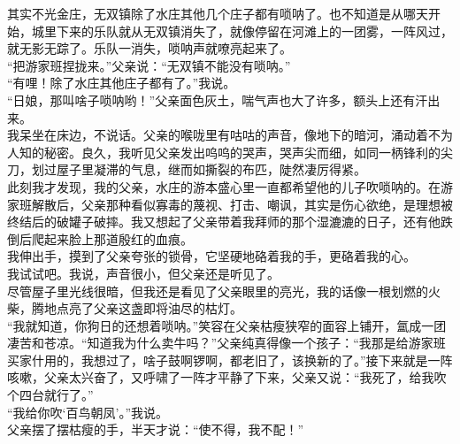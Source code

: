 其实不光金庄，无双镇除了水庄其他几个庄子都有唢呐了。也不知道是从哪天开始，城里下来的乐队就从无双镇消失了，就像停留在河滩上的一团雾，一阵风过，就无影无踪了。乐队一消失，唢呐声就嘹亮起来了。\\

“把游家班捏拢来。”父亲说：“无双镇不能没有唢呐。”\\

“有哩！除了水庄其他庄子都有了。”我说。\\

“日娘，那叫啥子唢呐哟！”父亲面色灰土，喘气声也大了许多，额头上还有汗出来。\\

我呆坐在床边，不说话。父亲的喉咙里有咕咕的声音，像地下的暗河，涌动着不为人知的秘密。良久，我听见父亲发出呜呜的哭声，哭声尖而细，如同一柄锋利的尖刀，划过屋子里凝滞的气息，继而如撕裂的布匹，陡然凄厉得紧。\\

此刻我才发现，我的父亲，水庄的游本盛心里一直都希望他的儿子吹唢呐的。在游家班解散后，父亲那种看似寡毒的蔑视、打击、嘲讽，其实是伤心欲绝，是理想被终结后的破罐子破摔。我又想起了父亲带着我拜师的那个湿漉漉的日子，还有他跌倒后爬起来脸上那道殷红的血痕。\\

我伸出手，摸到了父亲夸张的锁骨，它坚硬地硌着我的手，更硌着我的心。\\

我试试吧。我说，声音很小，但父亲还是听见了。\\

尽管屋子里光线很暗，但我还是看见了父亲眼里的亮光，我的话像一根划燃的火柴，腾地点亮了父亲这盏即将油尽的枯灯。\\

“我就知道，你狗日的还想着唢呐。”笑容在父亲枯瘦狭窄的面容上铺开，氲成一团凄苦和苍凉。“知道我为什么卖牛吗？”父亲纯真得像一个孩子：“我那是给游家班买家什用的，我想过了，啥子鼓啊锣啊，都老旧了，该换新的了。”接下来就是一阵咳嗽，父亲太兴奋了，又呼啸了一阵才平静了下来，父亲又说：“我死了，给我吹个四台就行了。”\\

“我给你吹‘百鸟朝凤’。”我说。\\

父亲摆了摆枯瘦的手，半天才说：“使不得，我不配！”\\